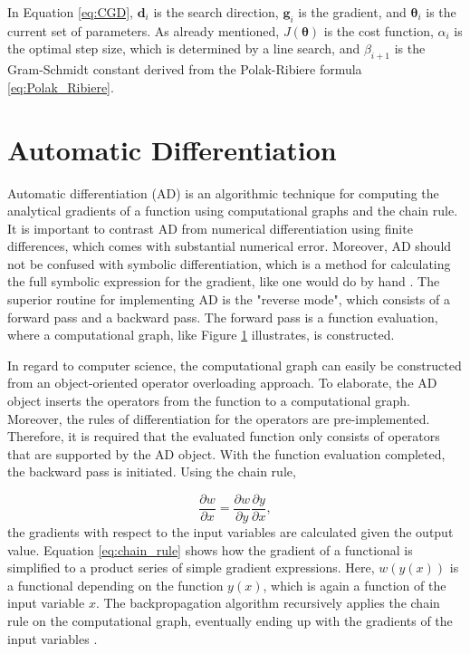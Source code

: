 In Equation \eqref{eq:CGD}, $\bm{d}_{i}$ is the search direction, $\bm{g}_{i}$ is the gradient, and $\bm{\theta}_{i}$ is the current set of parameters.
As already mentioned, $J(\bm{\theta})$ is the cost function, $\alpha_{i}$ is the optimal step size, which is determined by a line search, and $\beta_{i+1}$ is the Gram-Schmidt constant derived from the Polak-Ribiere formula \eqref{eq:Polak_Ribiere}.




\section{Automatic Differentiation}
\noindent
Automatic differentiation (AD) is an algorithmic technique for computing the analytical gradients of a function using computational graphs and the chain rule.
It is important to contrast AD from numerical differentiation using finite differences, which comes with substantial numerical error.
Moreover, AD should not be confused with symbolic differentiation, which is a method for calculating the full symbolic expression for the gradient, like one would do by hand \cite{baydin2018automatic}.
The superior routine for implementing AD is the "reverse mode", which consists of a forward pass and a backward pass.
The forward pass is a function evaluation, where a computational graph, like Figure \ref{} illustrates, is constructed.


In regard to computer science, the computational graph can easily be constructed from an object-oriented operator overloading approach.
To elaborate, the AD object inserts the operators from the function to a computational graph.
Moreover, the rules of differentiation for the operators are pre-implemented.
Therefore, it is required that the evaluated function only consists of operators that are supported by the AD object.
With the function evaluation completed, the backward pass is initiated. Using the chain rule,

\begin{equation}\label{eq:chain_rule}
    \frac{\partial w}{\partial x} = \frac{\partial w}{\partial y} \frac{\partial y}{\partial x},
\end{equation}
the gradients with respect to the input variables are calculated given the output value.
Equation \eqref{eq:chain_rule} shows how the gradient of a functional is simplified to a product series of simple gradient expressions.
Here, $w(y(x))$ is a functional depending on the function $y(x)$, which is again a function of the input variable $x$.
The backpropagation algorithm recursively applies the chain rule on the computational graph, eventually ending up with the gradients of the input variables \cite{baydin2018automatic}.

